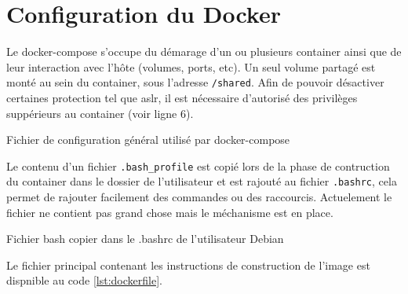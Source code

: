 \chapter{Configuration du Docker}
\label{chap:dockerConf}

Le docker-compose s'occupe du démarage d'un ou plusieurs container ainsi que de leur interaction avec l'hôte (volumes, ports, etc). Un seul volume partagé est monté au sein du container, sous l'adresse \texttt{/shared}. Afin de pouvoir désactiver certaines protection tel que \gls{aslr}, il est nécessaire d'autorisé des privilèges suppérieurs au container (voir ligne 6).

\begin{listing}
	\caption{Fichier de configuration général utilisé par docker-compose}
	\label{lst:dockerCompose}
\end{listing}

Le contenu d'un fichier \texttt{.bash_profile} est copié lors de la phase de contruction du container dans le dossier de l'utilisateur et est rajouté au fichier \texttt{.bashrc}, cela permet de rajouter facilement des commandes ou des raccourcis. Actuelement le fichier ne contient pas grand chose mais le méchanisme est en place.

\begin{listing}
	\caption{Fichier bash copier dans le .bashrc de l'utilisateur Debian}
	\label{lst:bashProfile}
\end{listing}

Le fichier principal contenant les instructions de construction de l'image est dispnible au code \ref{lst:dockerfile}.
